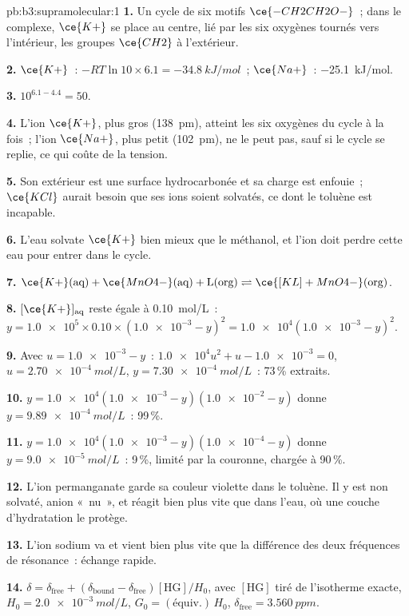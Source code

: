 \begin{solution}{pb:b3:supramolecular:1}
\textbf{1.} Un cycle de six motifs $\ce{-CH2CH2O-}$~; dans le complexe, $\ce{K+}$ se place au centre, lié par les
six oxygènes tournés vers l'intérieur, les groupes $\ce{CH2}$ à l'extérieur.

\textbf{2.} $\ce{K+}$~: $-RT\ln 10 \times 6.1 = \qty{-34.8}{kJ/mol}$~; $\ce{Na+}$~: \qty{-25.1}{kJ/mol}.

\textbf{3.} $10^{6.1 - 4.4} = 50$.

\textbf{4.} L'ion $\ce{K+}$, plus gros (\qty{138}{pm}), atteint les six oxygènes du cycle à la fois~; l'ion
$\ce{Na+}$, plus petit (\qty{102}{pm}), ne le peut pas, sauf si le cycle se replie, ce qui coûte de la tension.

\textbf{5.} Son extérieur est une surface hydrocarbonée et sa charge est enfouie~; $\ce{KCl}$
aurait besoin que ses ions soient solvatés, ce dont le toluène est incapable.

\textbf{6.} L'eau solvate $\ce{K+}$ bien mieux que le méthanol, et l'ion doit perdre cette
eau pour entrer dans le cycle.

\textbf{7.} $\ce{K+}(\text{aq}) + \ce{MnO4-}(\text{aq}) + \mathrm L(\text{org}) \rightleftharpoons \ce{[KL]+MnO4-}(\text{org})$.

\textbf{8.} $[\ce{K+}]_{\mathrm{aq}}$ reste égale à \qty{0.10}{mol/L}~: $y = \num{1.0e5} \times 0.10 \times (\num{1.0e-3} - y)^2 = \num{1.0e4}(\num{1.0e-3} - y)^2$.

\textbf{9.} Avec $u = \num{1.0e-3} - y$~: $\num{1.0e4}u^2 + u - \num{1.0e-3} = 0$, $u = \qty{2.70e-4}{mol/L}$, $y = \qty{7.30e-4}{mol/L}$~: 73\,\%
extraits.

\textbf{10.} $y = \num{1.0e4}(\num{1.0e-3} - y)(\num{1.0e-2} - y)$ donne $y = \qty{9.89e-4}{mol/L}$~: 99\,\%.

\textbf{11.} $y = \num{1.0e4}(\num{1.0e-3} - y)(\num{1.0e-4} - y)$ donne $y = \qty{9.0e-5}{mol/L}$~: 9\,\%, limité par la couronne,
chargée à 90\,\%.

\textbf{12.} L'ion permanganate garde sa couleur violette dans le toluène.
Il y est non solvaté, anion «~nu~», et réagit bien plus vite que dans
l'eau, où une couche d'hydratation le protège.

\textbf{13.} L'ion sodium va et vient bien plus vite que la différence des
deux fréquences de résonance~: échange rapide.

\textbf{14.} $\delta = \delta_{\mathrm{free}} + (\delta_{\mathrm{bound}} - \delta_{\mathrm{free}})[\mathrm{HG}]/H_0$, avec $[\mathrm{HG}]$ tiré de l'isotherme exacte, $H_0 = \qty{2.0e-3}{mol/L}$,
$G_0 = (\text{équiv.})\,H_0$, $\delta_{\mathrm{free}} = \qty{3.560}{ppm}$.


\end{solution}
